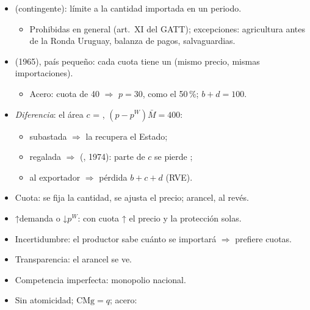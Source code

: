 \documentclass{article}
\begin{document}
\begin{columnas}
\begin{itemize}
\item {} (contingente): límite a la cantidad importada en un periodo.
  \begin{itemize}
  \item Prohibidas en general (art.~XI del GATT); excepciones: agricultura antes de la Ronda Uruguay, balanza de pagos, salvaguardias.
  \end{itemize}
\end{itemize}
\begin{itemize}
\item {} (1965), país pequeño: cada cuota tiene un  (mismo precio, mismas importaciones).
  \begin{itemize}
  \item Acero: cuota de 40 $\Rightarrow$ $p=30$, como el 50\,\%; $b+d=100$.
  \end{itemize}
\item \emph{Diferencia}: el área $c$ = , $(p-p^W)\bar M=400$:
  \begin{itemize}
  \item subastada $\Rightarrow$ la recupera el Estado;
  \item regalada $\Rightarrow$  (, 1974): parte de $c$ se pierde ;
  \item al exportador $\Rightarrow$ pérdida $b+c+d$ (RVE).
  \end{itemize}
\item Cuota: se fija la cantidad, se ajusta el precio; arancel, al revés.
\end{itemize}
\begin{itemize}
\item ↑demanda o ↓$p^W$: con cuota ↑ el precio y la protección solas.
\item Incertidumbre: el productor sabe cuánto se importará $\Rightarrow$ prefiere cuotas.
\item Transparencia: el arancel se ve.
\item Competencia imperfecta: monopolio nacional.
\end{itemize}
\begin{itemize}
\item Sin atomicidad; $\mathrm{CMg}=q$; acero:

\end{itemize}
\end{columnas}
\end{document}
